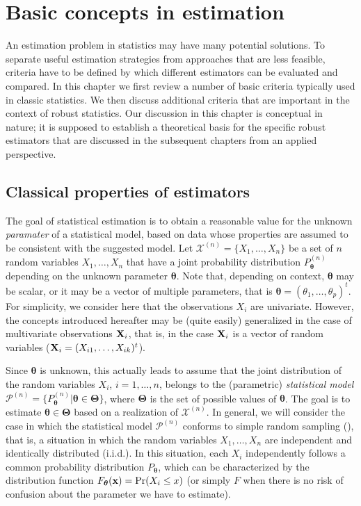 
\chapter{Basic concepts in estimation}
\label{chap:theory}

An estimation problem in statistics may have many potential solutions. To
separate useful estimation strategies from approaches that are less feasible,
criteria have to be defined by which different estimators can be evaluated and
compared. In this chapter we first review a number of basic criteria typically
used in classic statistics. We then discuss additional criteria that are
important in the context of robust statistics. Our discussion in this chapter
is conceptual in nature; it is supposed to establish a theoretical basis for
the specific robust estimators that are discussed in the subsequent chapters
from an applied perspective.

\section{Classical properties of estimators}

The goal of statistical estimation is to obtain a reasonable value for the
unknown \emph{paramater} of a statistical model, based on data whose properties
are assumed to be consistent with the suggested model. Let $\mathcal{X}^{(n)} =
\{X_1, \dots, X_n\}$ be a set of $n$ random variables $X_1, \ldots, X_n$ that
have a joint probability distribution $P_{\boldsymbol\theta}^{(n)}$ depending
on the unknown parameter $\boldsymbol\theta$. Note that, depending on context,
$\boldsymbol\theta$ may be scalar, or it may be a vector of multiple
parameters, that is $\boldsymbol\theta = (\theta_1, \dots, \theta_p)^t$. For
simplicity, we consider here that the observations $X_i$ are univariate.
However, the concepts introduced hereafter may be (quite easily) generalized in
the case of multivariate observations $\mathbf X_i$, that is, in the case
$\mathbf X_i$ is a vector of random variables
($\mathbf X_i=(X_{i1},\ldots,X_{ik})^t$).

Since $\boldsymbol\theta$ is unknown, this actually leads to assume that the
joint distribution of the random variables $X_i$, $i=1, \dots, n$, belongs to
the (parametric) \emph{statistical model} $\mathcal{P}^{(n)} =
\{P_{\boldsymbol\theta}^{(n)} | \boldsymbol\theta \in \boldsymbol\Theta\}$,
where $\boldsymbol\Theta$ is the set of possible values of $\boldsymbol\theta$.
The goal is to estimate $\boldsymbol\theta \in \boldsymbol\Theta$ based on a
realization of $\mathcal{X}^{(n)}$. In general, we will consider the case in
which the statistical model $\mathcal{P}^{(n)}$ conforms to simple random
sampling (), that is, a situation in which the random variables $X_1,
\dots, X_n$ are independent and identically distributed (i.i.d.). In this
situation, each $X_i$ independently follows a common probability distribution
$P_{\boldsymbol\theta}$, which can be characterized by the distribution
function $F_{\boldsymbol\theta}(\mathbf x) = \Pr(X_i \leq x)$ (or simply $F$
when there is no risk of confusion about the parameter we have to estimate).

